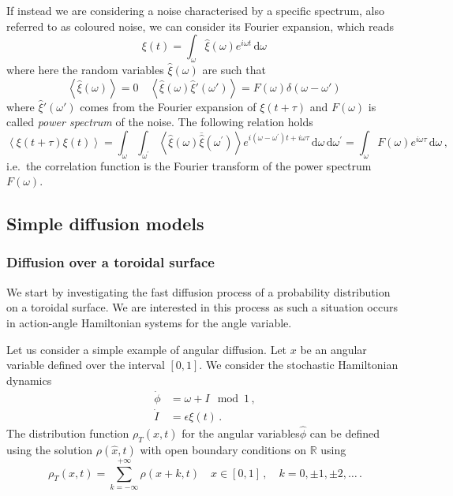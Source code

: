 If instead we are considering a noise characterised by a specific spectrum, also referred to as coloured noise, we can consider its Fourier expansion, which reads
\begin{equation}
    \xi(t) = \int_\omega \hat{\xi}(\omega)e^{i\omega t}\,\mathrm{d}\omega\,
\end{equation}
where here the random variables $\hat{\xi}(\omega)$ are such that
\begin{equation}
    \left\langle \hat{\xi}(\omega) \right\rangle = 0 \quad \left\langle \hat{\xi}(\omega)\hat{\xi}'(\omega') \right\rangle = F(\omega)\delta(\omega - \omega')\,
\end{equation}
where $\hat{\xi}'(\omega')$ comes from the Fourier expansion of $\xi(t+\tau)$ and $F(\omega)$ is called \textit{power spectrum} of the noise. The following relation holds
\begin{equation}
    \left\langle\xi(t+\tau) \xi(t)\right\rangle=\int_\omega \int_{\omega^{\prime}} \left\langle\hat{\xi}(\omega) \overline{\hat{\xi}}\left(\omega^{\prime}\right)\right\rangle e^{i\left(\omega-\omega^{\prime}\right) t+i \omega \tau} \,\mathrm{d} \omega \,\mathrm{d} \omega^{\prime}=\int_\omega F(\omega) e^{i \omega \tau} \,\mathrm{d} \omega\,,
\end{equation}
i.e.\ the correlation function is the Fourier transform of the power spectrum $F(\omega)$.

\subsection{Simple diffusion models}

\subsubsection*{Diffusion over a toroidal surface}

We start by investigating the fast diffusion process of a probability distribution on a toroidal surface. We are interested in this process as such a situation occurs in action-angle Hamiltonian systems for the angle variable.

Let us consider a simple example of angular diffusion. Let \(x\) be an angular variable defined over the interval \([0,1]\). We consider the stochastic Hamiltonian dynamics
\begin{equation}
	\begin{aligned}
		\dot{\phi} &= \omega + I \mod{1}\,, \\
		\dot{I} &= \epsilon\xi(t)	\,.
	\end{aligned}
	\label{eq:langevin_toro}
\end{equation}
The distribution function \(\rho_T(\hat{x},t)\) for the angular variables\(\hat{\phi}\) can be defined using the solution  \(\rho(\hat{x},t)\) with open boundary conditions on \(\mathbb{R}\) using
\begin{equation}
	\rho_T(x,t) = \sum_{k=-\infty}^{+\infty} \rho(x+k,t) \quad x\in[0,1]\,,\quad k = 0,\pm 1, \pm 2, \ldots \,.
 \label{eq:period}
\end{equation}

